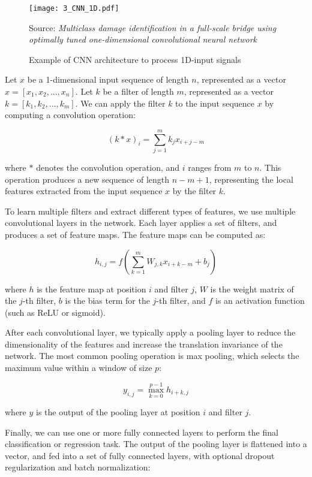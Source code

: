  \begin{figure}[h]
 	\centering
 	\texttt{[image: 3\_CNN\_1D.pdf]}
 	\caption{Example of CNN architecture to process 1D-input signals}
 	Source: \textit{Multiclass damage identification in a full-scale bridge using optimally tuned one-dimensional convolutional neural network} \cite{sony2022multiclass}
 	\label{fig:3_CNN_1D}
 \end{figure}
 
Let $x$ be a 1-dimensional input sequence of length $n$, represented as a vector $x = [x_1, x_2, ..., x_n]$. Let $k$ be a filter of length $m$, represented as a vector $k = [k_1, k_2, ..., k_m]$. We can apply the filter $k$ to the input sequence $x$ by computing a convolution operation:

$$(k * x)_i = \sum_{j=1}^m k_j x_{i+j-m}$$

where $*$ denotes the convolution operation, and $i$ ranges from $m$ to $n$. This operation produces a new sequence of length $n - m + 1$, representing the local features extracted from the input sequence $x$ by the filter $k$.

To learn multiple filters and extract different types of features, we use multiple convolutional layers in the network. Each layer applies a set of filters, and produces a set of feature maps. The feature maps can be computed as:

$$h_{i,j} = f(\sum_{k=1}^m W_{j,k} x_{i+k-m} + b_j)$$

where $h$ is the feature map at position $i$ and filter $j$, $W$ is the weight matrix of the $j$-th filter, $b$ is the bias term for the $j$-th filter, and $f$ is an activation function (such as ReLU or sigmoid).

After each convolutional layer, we typically apply a pooling layer to reduce the dimensionality of the features and increase the translation invariance of the network. The most common pooling operation is max pooling, which selects the maximum value within a window of size $p$:

$$y_{i,j} = \max_{k=0}^{p-1} h_{i+k,j}$$

where $y$ is the output of the pooling layer at position $i$ and filter $j$.

Finally, we can use one or more fully connected layers to perform the final classification or regression task. The output of the pooling layer is flattened into a vector, and fed into a set of fully connected layers, with optional dropout regularization and batch normalization:

